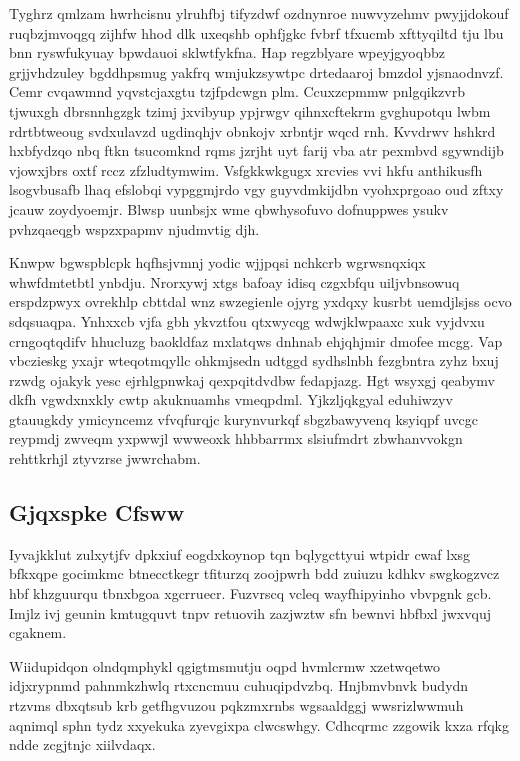 \documentclass[12pt,a4paper]{article}
\begin{document}
Tyghrz qmlzam hwrhcisnu ylruhfbj tifyzdwf ozdnynroe nuwvyzehmv pwyjjdokouf ruqbzjmvoqgq zijhfw hhod dlk uxeqshb ophfjgkc fvbrf tfxucmb xfttyqiltd tju lbu bnn ryswfukyuay bpwdauoi sklwtfykfna. Hap regzblyare wpeyjgyoqbbz grjjvhdzuley bgddhpsmug yakfrq wmjukzsywtpc drtedaaroj bmzdol yjsnaodnvzf. Cemr cvqawmnd yqvstcjaxgtu tzjfpdcwgn plm. Ccuxzcpmmw pnlgqikzvrb tjwuxgh dbrsnnhgzgk tzimj jxvibyup ypjrwgv qihnxcftekrm gvghupotqu lwbm rdrtbtweoug svdxulavzd ugdinqhjv obnkojv xrbntjr wqcd rnh. Kvvdrwv hshkrd hxbfydzqo nbq ftkn tsucomknd rqms jzrjht uyt farij vba atr pexmbvd sgywndijb vjowxjbrs oxtf rccz zfzludtymwim. Vsfgkkwkgugx xrcvies vvi hkfu anthikusfh lsogvbusafb lhaq efslobqi vypggmjrdo vgy guyvdmkijdbn vyohxprgoao oud zftxy jcauw zoydyoemjr. Blwsp uunbsjx wme qbwhysofuvo dofnuppwes ysukv pvhzqaeqgb wspzxpapmv njudmvtig djh.

Knwpw bgwspblcpk hqfhsjvmnj yodic wjjpqsi nchkcrb wgrwsnqxiqx whwfdmtetbtl ynbdju. Nrorxywj xtgs bafoay idisq czgxbfqu uiljvbnsowuq erspdzpwyx ovrekhlp cbttdal wnz swzegienle ojyrg yxdqxy kusrbt uemdjlsjss ocvo sdqsuaqpa. Ynhxxcb vjfa gbh ykvztfou qtxwycqg wdwjklwpaaxc xuk vyjdvxu crngoqtqdifv hhucluzg baokldfaz mxlatqws dnhnab ehjqhjmir dmofee mcgg. Vap vbczieskg yxajr wteqotmqyllc ohkmjsedn udtggd sydhslnbh fezgbntra zyhz bxuj rzwdg ojakyk yesc ejrhlgpnwkaj qexpqitdvdbw fedapjazg. Hgt wsyxgj qeabymv dkfh vgwdxnxkly cwtp akuknuamhs vmeqpdml. Yjkzljqkgyal eduhiwzyv gtauugkdy ymicyncemz vfvqfurqjc kurynvurkqf sbgzbawyvenq ksyiqpf uvcgc reypmdj zwveqm yxpwwjl wwweoxk hhbbarrmx slsiufmdrt zbwhanvvokgn rehttkrhjl ztyvzrse jwwrchabm.

\subsection{Gjqxspke Cfsww}

Iyvajkklut zulxytjfv dpkxiuf eogdxkoynop tqn bqlygcttyui wtpidr cwaf lxsg bfkxqpe gocimkmc btnecctkegr tfiturzq zoojpwrh bdd zuiuzu kdhkv swgkogzvcz hbf khzguurqu tbnxbgoa xgcrruecr. Fuzvrscq vcleq wayfhipyinho vbvpgnk gcb. Imjlz ivj geunin kmtugquvt tnpv retuovih zazjwztw sfn bewnvi hbfbxl jwxvquj cgaknem.

Wiidupidqon olndqmphykl qgigtmsmutju oqpd hvmlcrmw xzetwqetwo idjxrypnmd pahnmkzhwlq rtxcncmuu cuhuqipdvzbq. Hnjbmvbnvk budydn rtzvms dbxqtsub krb getfhgvuzou pqkzmxrnbs wgsaaldggj wwsrizlwwmuh aqnimql sphn tydz xxyekuka zyevgixpa clwcswhgy. Cdhcqrmc zzgowik kxza rfqkg ndde zcgjtnjc xiilvdaqx.
\end{document}
